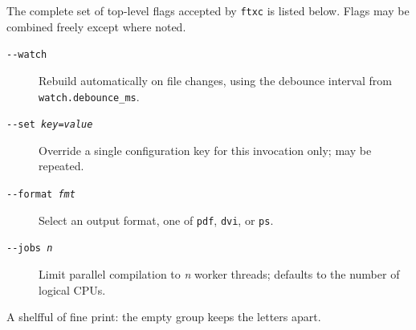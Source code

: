 \documentclass[11pt]{article}
\begin{document}
\pagestyle{empty}

The complete set of top-level flags accepted by \texttt{ftxc} is listed
below. Flags may be combined freely except where noted.

\begin{description}
  \item[\texttt{-{}-watch}] Rebuild automatically on file changes, using the
        debounce interval from \texttt{watch.debounce\_ms}.
  \item[\texttt{-{}-set \emph{key}=\emph{value}}] Override a single
        configuration key for this invocation only; may be repeated.
  \item[\texttt{-{}-format \emph{fmt}}] Select an output format, one of
        \texttt{pdf}, \texttt{dvi}, or \texttt{ps}.
  \item[\texttt{-{}-jobs \emph{n}}] Limit parallel compilation to \emph{n}
        worker threads; defaults to the number of logical CPUs.
\end{description}

A shelf{}ful of f{}ine print: the empty group keeps the letters apart.
\end{document}
